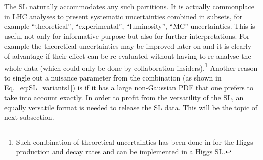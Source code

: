 \documentclass[11pt]{article}
\begin{document}
The SL naturally accommodates any such partitions. It is actually  commonplace in LHC analyses   to present systematic uncertainties combined in subsets, for example ``theoretical'', ``experimental'', ``luminosity'', ``MC'' uncertainties. 
This is useful not only for informative purpose but also for further interpretations. 
For example the theoretical uncertainties may be improved later on 
and it is clearly of advantage if their effect can be re-evaluated without having to re-analyse the whole data (which could only be done by collaboration insiders).\footnote{Such combination of theoretical uncertainties  has been done in \cite{Arbey:2016kqi}  for the Higgs production and decay rates and can be implemented in a Higgs SL.}
Another reason to single out a nuisance parameter  from the combination (as shown in Eq.~\eqref{eq:SL_variants1})
is if it has a large non-Gaussian PDF that one prefers to take into account exactly.
In order to profit from the  versatility of the SL, an equally  versatile format is needed to release the SL data. This will be the topic of next subsection.


\end{document}
